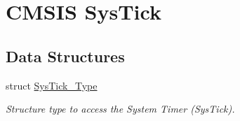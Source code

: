 \hypertarget{group___c_m_s_i_s___sys_tick}{\section{C\-M\-S\-I\-S Sys\-Tick}
\label{group___c_m_s_i_s___sys_tick}
}
\subsection*{Data Structures}
\begin{DoxyCompactItemize}
\item 
struct \hyperlink{struct_sys_tick___type}{Sys\-Tick\-\_\-\-Type}
\begin{DoxyCompactList}\small\item\em Structure type to access the System Timer (Sys\-Tick). \end{DoxyCompactList}\end{DoxyCompactItemize}
